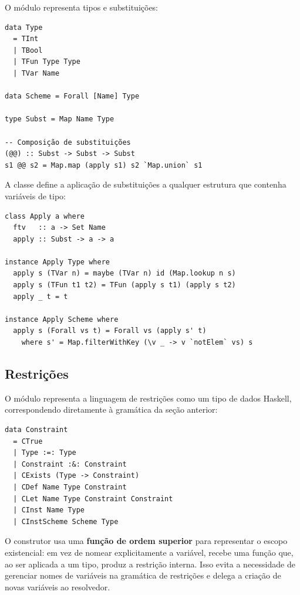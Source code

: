   O módulo  representa tipos e substituições:

\begin{verbatim}
data Type
  = TInt
  | TBool
  | TFun Type Type
  | TVar Name

data Scheme = Forall [Name] Type

type Subst = Map Name Type

-- Composição de substituições
(@@) :: Subst -> Subst -> Subst
s1 @@ s2 = Map.map (apply s1) s2 `Map.union` s1
\end{verbatim}

  A classe  define a aplicação de
  substituições a qualquer estrutura que contenha variáveis de tipo:

\begin{verbatim}
class Apply a where
  ftv   :: a -> Set Name
  apply :: Subst -> a -> a

instance Apply Type where
  apply s (TVar n) = maybe (TVar n) id (Map.lookup n s)
  apply s (TFun t1 t2) = TFun (apply s t1) (apply s t2)
  apply _ t = t

instance Apply Scheme where
  apply s (Forall vs t) = Forall vs (apply s' t)
    where s' = Map.filterWithKey (\v _ -> v `notElem` vs) s
\end{verbatim}

  \subsection{Restrições}

  O módulo  representa a
  linguagem de restrições como um tipo de dados Haskell, correspondendo
  diretamente à gramática da seção anterior:

\begin{verbatim}
data Constraint
  = CTrue
  | Type :=: Type
  | Constraint :&: Constraint
  | CExists (Type -> Constraint)
  | CDef Name Type Constraint
  | CLet Name Type Constraint Constraint
  | CInst Name Type
  | CInstScheme Scheme Type
\end{verbatim}

  O construtor  usa uma \textbf{função
  de ordem superior} para representar o escopo existencial: em vez de
  nomear explicitamente a variável, recebe uma função
   que, ao ser aplicada a
  um tipo, produz a restrição interna. Isso evita a necessidade
  de gerenciar nomes de variáveis na gramática de restrições e delega a
  criação de novas variáveis ao resolvedor.


